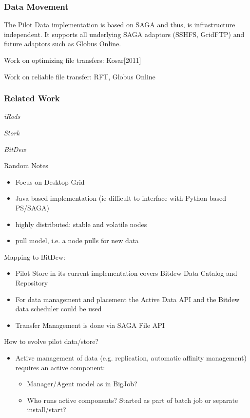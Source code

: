 \documentclass[conference,final]{IEEEtran}
\begin{document}
\subsubsection{Data Movement}

The Pilot Data implementation is based on SAGA and thus, is infrastructure
independent. It supports all underlying SAGA adaptors (SSHFS, GridFTP) and
future adaptors such as Globus Online.

Work on optimizing file transfers: Kosar[2011]

Work on reliable file transfer: RFT, Globus Online


\subsubsection{Related Work}

\emph{iRods}


\emph{Stork}


\emph{BitDew}

Random Notes
\begin{itemize}
	\item Focus on Desktop Grid
	\item Java-based implementation (ie difficult to interface with Python-based PS/SAGA)
	\item highly distributed: stable and volatile nodes
	\item pull model, i.e. a node pulls for new data
\end{itemize}


Mapping to BitDew:
\begin{itemize}
	\item Pilot Store in its current implementation covers Bitdew Data Catalog and Repository
	\item For data management and placement the Active Data API and the Bitdew data scheduler could be used
	\item Transfer Management is done via SAGA File API	
\end{itemize}

How to evolve pilot data/store?
\begin{itemize}
	\item Active management of data (e.g. replication, automatic affinity management) requires an active component:
	\begin{itemize}
		\item Manager/Agent model as in BigJob?
		\item Who runs active components? Started as part of batch job or separate install/start?
	\end{itemize}
\end{itemize}
\end{document}
